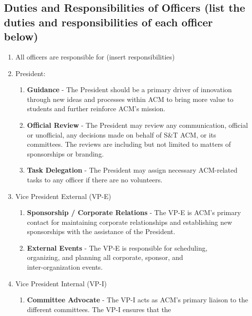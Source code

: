   \subsection{Duties and Responsibilities of Officers (list the duties and
  responsibilities of each officer below)}
    \begin{enumerate}[label=\arabic*.]
      \item All officers are responsible for (insert responsibilities)
      \item President:
        \begin{enumerate}[label=\alph*.]
          \item \textbf{Guidance} - The President should be a primary driver of
            innovation through new ideas and processes within ACM to bring more
            value to students and further reinforce ACM's mission.
          \item \textbf{Official Review} - The President may review any
          communication, official or unofficial, any decisions made on behalf of
          S\&T ACM, or its committees. The reviews are including but not limited
          to matters of sponsorships or branding.
          \item \textbf{Task Delegation} - The President may assign necessary
            ACM-related tasks to any officer if there are no volunteers.
        \end{enumerate}
      \item Vice President External (VP-E)
        \begin{enumerate}[label=\alph*.]
          \item \textbf{Sponsorship / Corporate Relations} - The VP-E is ACM's
            primary contact for maintaining corporate relationships and
            establishing new sponsorships with the assistance of the President.
          \item \textbf{External Events} - The VP-E is responsible for
            scheduling,\\ organizing, and planning all corporate, sponsor, and\\
            inter-organization events.
        \end{enumerate}
      \item Vice President Internal (VP-I)
        \begin{enumerate}[label=\alph*.]
          \item \textbf{Committee Advocate} - The VP-I acts as ACM's primary
            liaison to the different committees. The VP-I ensures that the

\end{enumerate}
\end{enumerate}

